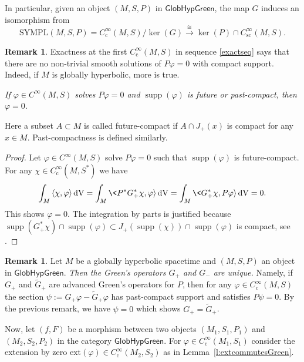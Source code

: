 \documentclass[a4paper,11pt]{amsart}
\theoremstyle{definition}
\newtheorem{rem}[thm]{Remark}
\begin{document}
In particular, given an object $(M,S,P)$ in ${\mathsf{GlobHypGreen}}$, the map $G$ induces an isomorphism from 
$$
{\mathrm{SYMPL}}(M,S,P)={C^\infty_\mathrm{c}}(M,S)/\ker(G) \xrightarrow{\cong} \ker(P)\cap {C^\infty_\mathrm{sc}}(M,S).
$$ 

\begin{rem}\label{rem:futurecompact}
Exactness at the first ${C^\infty_\mathrm{c}}(M,S)$ in sequence \eqref{exactseq} says that there are no non-trivial smooth solutions of $P{\varphi}=0$ with compact support.
Indeed, if $M$ is globally hyperbolic, more is true.

\emph{If ${\varphi}\in{C^\infty}(M,S)$ solves $P{\varphi}=0$ and ${\operatorname{supp}}({\varphi})$ is future or past-compact, then ${\varphi}=0$.}

Here a subset $A\subset M$ is called future-compact if $A\cap J_+(x)$ is compact for any $x\in M$.
Past-compactness is defined similarly.

\begin{proof}
Let ${\varphi}\in{C^\infty}(M,S)$ solve $P{\varphi}=0$ such that ${\operatorname{supp}}({\varphi})$ is future-compact.
For any $\chi\in{C^\infty_\mathrm{c}}(M,S^*)$ we have
$$
\int_M{\langle}\chi,{\varphi}{\rangle}{\,\mathrm{dV}}
=
\int_M\<P^*G^*_+\chi,{\varphi}{\rangle}{\,\mathrm{dV}}
=
\int_M\<G^*_+\chi,P{\varphi}{\rangle}{\,\mathrm{dV}}
=
0.
$$
This shows ${\varphi}=0$.
The integration by parts is justified because ${\operatorname{supp}}(G^*_+\chi)\cap{\operatorname{supp}}({\varphi}) \subset J_+({\operatorname{supp}}(\chi))\cap{\operatorname{supp}}({\varphi})$ is compact, see \cite[Lemma~A.5.3]{BGP}.
\end{proof}
\end{rem}

\begin{rem}\label{rem:GreenUnique}
Let $M$ be a globally hyperbolic spacetime and $(M,S,P)$ an object in ${\mathsf{GlobHypGreen}}$.
{\em Then the Green's operators $G_+$ and $G_-$ are unique.}
Namely, if $G_+$ and $\tilde G_+$ are advanced Green's operators for $P$, then for any ${\varphi}\in{C^\infty_\mathrm{c}}(M,S)$ the section $\psi:=G_+{\varphi}-\tilde G_+{\varphi}$ has past-compact support and satisfies $P\psi=0$.
By the previous remark, we have $\psi=0$ which shows $G_+=\tilde G_+$.
\end{rem}

Now, let $(f,F)$ be a morphism between two objects $(M_1,S_1,P_1)$ and $(M_2,S_2,P_2)$ in the category ${\mathsf{GlobHypGreen}}$.
For ${\varphi}\in{C^\infty_\mathrm{c}}(M_1,S_1)$ consider the extension by zero ${\mathrm{ext}}({\varphi})\in{C^\infty_\mathrm{c}}(M_2,S_2)$ as in Lemma~\ref{l:extcommutesGreen}. 
\end{document}
